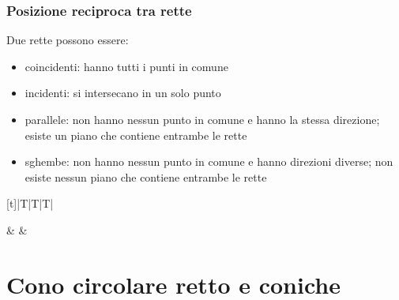 \documentclass[letterpaper,10pt,italian]{jupyterBook}
\begin{document}
\subsubsection{Posizione reciproca tra rette}
\label{\detokenize{ch/analytic_geometry/analytic_geometry_3d/lines:posizione-reciproca-tra-rette}}
\sphinxAtStartPar
Due rette possono essere:
\begin{itemize}
\item {} 
\sphinxAtStartPar
coincidenti: hanno tutti i punti in comune

\item {} 
\sphinxAtStartPar
incidenti: si intersecano in un solo punto

\item {} 
\sphinxAtStartPar
parallele: non hanno nessun punto in comune e hanno la stessa direzione; esiste un piano che contiene entrambe le rette

\item {} 
\sphinxAtStartPar
sghembe: non hanno nessun punto in comune e hanno direzioni diverse; non esiste nessun piano che contiene entrambe le rette

\end{itemize}

\sphinxAtStartPar
{} 


\begin{savenotes}\sphinxattablestart
\centering
\begin{tabulary}{\linewidth}[t]{|T|T|T|}
\hline

\sphinxAtStartPar
{}
&
\sphinxAtStartPar
{}
&
\sphinxAtStartPar
{}
\\
\hline
\end{tabulary}
\par
\sphinxattableend\end{savenotes}

\sphinxstepscope


\section{Cono circolare retto e coniche}
\label{\detokenize{ch/analytic_geometry/analytic_geometry_3d/cone:cono-circolare-retto-e-coniche}}\label{\detokenize{ch/analytic_geometry/analytic_geometry_3d/cone:geometry-analytic-3d-cone}}\label{\detokenize{ch/analytic_geometry/analytic_geometry_3d/cone::doc}}
\end{document}
